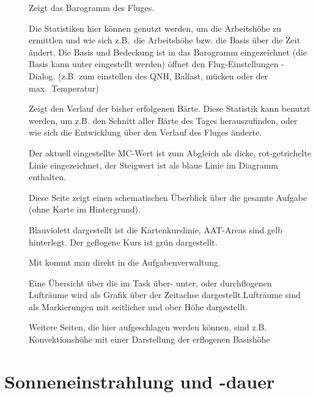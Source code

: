 \begin{description}
\item[]  Zeigt das Barogramm des Fluges.

Die Statistiken hier können genutzt werden, um die Arbeitshöhe zu ermittlen und wie sich z.B.\  die Arbeitshöhe bzw. die Basis über die Zeit ändert. Die Basis und Bedeckung ist in das Barogramm eingezeichnet (die Basis kann unter   eingestellt werden)
  öffnet den Flug-Einstellungen - Dialog.
  (z.B. zum einstellen des QNH, Ballast, mücken oder der max.\ Temperatur)
\vspace{7em}

\item[]
  Zeigt den Verlauf der bisher erfolgenen Bärte.
  Diese Statistik kann benutzt werden, um z.B. den Schnitt aller Bärte des Tages herauszufinden, oder wie sich die Entwicklung über den Verlauf des Fluges änderte.

  Der aktuell eingestellte MC-Wert  ist zum Abgleich als dicke, rot-getrichelte Linie eingezeichnet, der Steigwert ist als blaue Linie im Diagramm enthalten.

\vspace{5em}
\newpage
\item[]
Diese Seite zeigt einen schematischen Überblick über die gesamte Aufgabe (ohne Karte im Hintergrund).


Blauviolett dargestellt ist die Kartenkurslinie, AAT-Areas sind gelb hinterlegt. 
Der geflogene Kurs ist grün dargestellt.

Mit  kommt man direkt in die Aufgabenverwaltung.


\vspace{7em}
\item[]
Eine Übersicht über die im Task über- unter, oder durchflogenen Lufträume wird als Grafik über der Zeitachse dargestellt.Lufträume sind als Markierungen mit seitlicher und ober Höhe  dargestellt.

Weitere Seiten, die hier aufgeschlagen werden können,  sind z.B. Konvektionshöhe mit einer Darstellung der erflogenen Basishöhe
\vspace{7em}

\end{description}

\section{Sonneneinstrahlung und -dauer}

